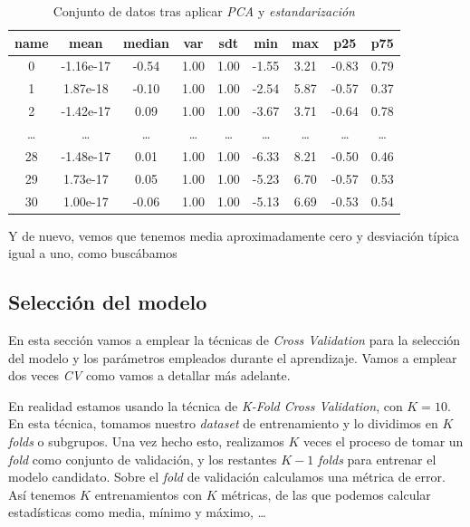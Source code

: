\documentclass[11pt]{article}
\begin{document}
\begin{table}[H]
\centering
\begin{tabular}{|c|c|c|c|c|c|c|c|c|}
\hline
\textbf{name}&                \textbf{mean}&     \textbf{median}&          \textbf{var}&        \textbf{sdt}&       \textbf{min}&         \textbf{max}&       \textbf{p25}&        \textbf{p75} \\
\hline
0               &-1.16e-17  &-0.54     &1.00   &1.00 &-1.55    &3.21 &-0.83   &0.79 \\
1               & 1.87e-18  &-0.10     &1.00   &1.00 &-2.54    &5.87 &-0.57   &0.37 \\
2               &-1.42e-17  & 0.09     &1.00   &1.00 &-3.67    &3.71 &-0.64   &0.78 \\
\ldots &  \ldots & \ldots & \ldots & \ldots &  \ldots & \ldots & \ldots & \ldots \\
28              &-1.48e-17  & 0.01     &1.00   &1.00 &-6.33    &8.21 &-0.50   &0.46 \\
29              & 1.73e-17  & 0.05     &1.00   &1.00 &-5.23    &6.70 &-0.57   &0.53 \\
30              & 1.00e-17  &-0.06     &1.00   &1.00 &-5.13    &6.69 &-0.53   &0.54 \\
\hline
    \end{tabular}
    \caption{Conjunto de datos tras aplicar \emph{PCA} y \emph{estandarización}}
\end{table}

Y de nuevo, vemos que tenemos media aproximadamente cero y desviación típica igual a uno, como buscábamos

\pagebreak
\subsection{Selección del modelo}

En esta sección vamos a emplear la técnicas de \emph{Cross Validation} para la selección del modelo y los parámetros empleados durante el aprendizaje. Vamos a emplear dos veces \emph{CV} como vamos a detallar más adelante.

En realidad estamos usando la técnica de \emph{K-Fold Cross Validation}, con $K = 10$. En esta técnica, tomamos nuestro \emph{dataset} de entrenamiento y lo dividimos en $K$ \emph{folds} o subgrupos. Una vez hecho esto, realizamos $K$ veces el proceso de tomar un \emph{fold} como conjunto de validación, y los restantes $K-1$ \emph{folds} para entrenar el modelo candidato. Sobre el \emph{fold} de validación calculamos una métrica de error. Así tenemos $K$ entrenamientos con $K$ métricas, de las que podemos calcular estadísticas como media, mínimo y máximo, \ldots
\end{document}
